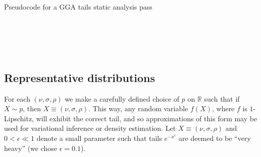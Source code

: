 \documentclass[thesis.tex]{subfiles}
\begin{document}

\begin{algorithm}
	\caption{Pseudocode for a GGA tails static analysis pass}\label{alg:bfs_typecheck}
	\begin{algorithmic}
	
	
	\\
	
	\\
	\\
	\ENDWHILE
	
	\end{algorithmic}
\end{algorithm}


\subsection{Representative distributions}\label{ssec:repr_dist}

For each $(\nu,\sigma,\rho)$ we make a carefully defined choice of $p$ on $\mathbb{R}$ such that if $X \sim p$, then $X \equiv (\nu,\sigma,\rho)$. This way, any random variable $f(X)$, where $f$ is $1$-Lipschitz, will exhibit the correct tail, and so approximations of this form may be used for variational inference or density estimation. Let $X \equiv (\nu,\sigma,\rho)$ and $0 < \epsilon \ll 1$ denote a small parameter such that tails $e^{-x^\epsilon}$ are deemed to be ``very heavy'' (we chose $\epsilon = 0.1$). %
\end{document}
